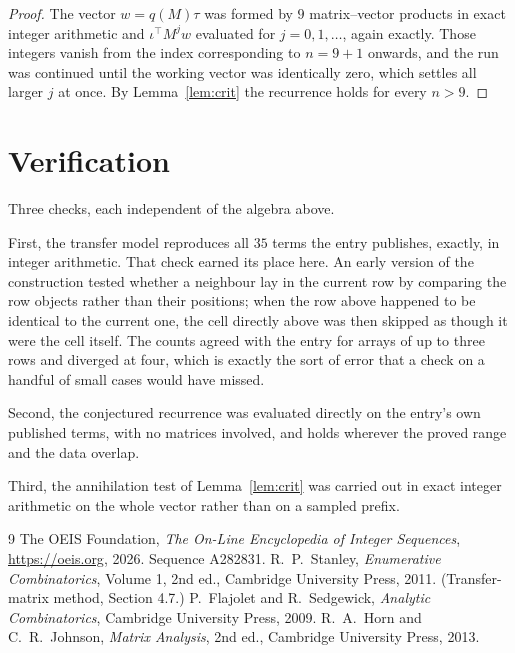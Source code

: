 \documentclass[11pt,a4paper]{article}
\theoremstyle{plain}
\theoremstyle{definition}
\begin{document}
\begin{proof}
The vector $w=q(M)\tau$ was formed by $9$ matrix--vector products in exact integer
arithmetic and $\iota^{\!\top}M^{j}w$ evaluated for $j=0,1,\dots$, again exactly. Those
integers vanish from the index corresponding to $n=9+1$ onwards, and the run was
continued until the working vector was identically zero, which settles all larger $j$ at once.
By Lemma~\ref{lem:crit} the recurrence holds for every $n>9$.
\end{proof}

\section{Verification}

Three checks, each independent of the algebra above.

First, the transfer model reproduces all $35$ terms the entry publishes, exactly, in
integer arithmetic. That check earned its place here. An early version of the construction
tested whether a neighbour lay in the current row by comparing the row objects rather
than their positions; when the row above happened to be identical to the current one, the
cell directly above was then skipped as though it were the cell itself. The counts agreed with
the entry for arrays of up to three rows and diverged at four, which is exactly the sort of
error that a check on a handful of small cases would have missed.

Second, the conjectured recurrence was evaluated directly on the entry's own published terms,
with no matrices involved, and holds wherever the proved range and the data overlap.

Third, the annihilation test of Lemma~\ref{lem:crit} was carried out in exact integer
arithmetic on the whole vector rather than on a sampled prefix.

\begin{thebibliography}{9}
 The OEIS Foundation, \emph{The On-Line Encyclopedia of Integer
Sequences}, \url{https://oeis.org}, 2026. Sequence A282831.
 R.~P.~Stanley, \emph{Enumerative Combinatorics}, Volume 1, 2nd ed.,
Cambridge University Press, 2011. (Transfer-matrix method, Section 4.7.)
 P.~Flajolet and R.~Sedgewick, \emph{Analytic Combinatorics}, Cambridge
University Press, 2009.
 R.~A.~Horn and C.~R.~Johnson, \emph{Matrix Analysis}, 2nd ed., Cambridge
University Press, 2013.
\end{thebibliography}
\end{document}
